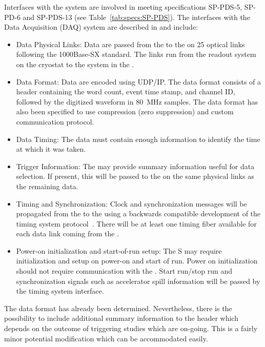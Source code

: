 Interfaces with the  system are involved in meeting specifications SP-PDS-5, SP-PD-6 and SP-PDS-13 (see Table~\ref{tab:specs:SP-PDS}).  The  interfaces with the Data Acquisition (DAQ) system are described in  and include:



\begin{itemize}

\item Data Physical Links: Data are passed from the  to the  on 25 optical links following the 1000Base-SX standard. The links run from the  readout system on the cryostat to the  system in the .

\item Data Format: Data are encoded using UDP/IP.  The data format consists of a header containing the word count, event time stamp, and channel ID, followed by the digitized waveform in \SI{80}{MHz} samples.
The data format has also been specified to use compression (zero suppression) and custom communication protocol.

\item Data Timing: The data must contain enough information to identify the time at which it was taken.

\item Trigger Information: The  may provide summary information useful for data selection. If present, this will be passed to the  on the same physical links as the remaining data.

\item Timing and Synchronization: Clock and synchronization messages will be propagated from the  to the  using a backwards compatible development of the  timing system protocol~\cite{bib:docdb1651}. There will be at least one timing fiber available for each data link coming from the . 

\item Power-on initialization and start-of-run setup:  The S may require initialization and setup on power-on and start of run. Power on initialization should not require communication with the . Start run/stop run and synchronization signals such as accelerator spill information will be passed by the timing system interface.

\end{itemize}

The data format has already been determined. Nevertheless, there is the possibility to include additional summary information to the header which depends on the outcome of triggering studies which are on-going. This is a fairly minor potential modification which can be accommodated easily.



